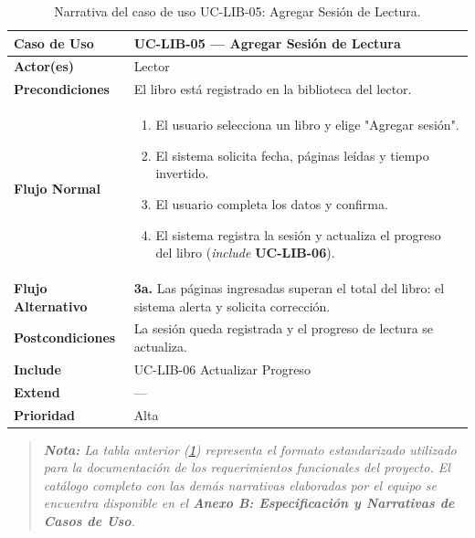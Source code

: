 \documentclass[12pt, atypical, journal]{article}
\begin{document}
\begin{table}[H]
\centering
\footnotesize
\begin{tabular}{|p{3.5cm}|p{10.5cm}|}
\hline
\textbf{Caso de Uso} & \textbf{UC-LIB-05 — Agregar Sesión de Lectura} \\ \hline
\textbf{Actor(es)} & Lector \\ \hline
\textbf{Precondiciones} & El libro está registrado en la biblioteca del lector. \\ \hline
\textbf{Flujo Normal} & 
\begin{minipage}{10cm}
\vspace{1mm}
\begin{enumerate}
    \item El usuario selecciona un libro y elige "Agregar sesión".
    \item El sistema solicita fecha, páginas leídas y tiempo invertido.
    \item El usuario completa los datos y confirma.
    \item El sistema registra la sesión y actualiza el progreso del libro (\textit{include} \textbf{UC-LIB-06}).
\end{enumerate}
\vspace{1mm}
\end{minipage} \\ \hline
\textbf{Flujo Alternativo} & 
\begin{minipage}{10cm}
\vspace{1mm}
\textbf{3a.} Las páginas ingresadas superan el total del libro: el sistema alerta y solicita corrección.
\vspace{1mm}
\end{minipage} \\ \hline
\textbf{Postcondiciones} & La sesión queda registrada y el progreso de lectura se actualiza. \\ \hline
\textbf{Include} & UC-LIB-06 Actualizar Progreso \\ \hline
\textbf{Extend} & — \\ \hline
\textbf{Prioridad} & Alta \\ \hline
\end{tabular}
\caption{Narrativa del caso de uso UC-LIB-05: Agregar Sesión de Lectura.}
\label{tab:uc_lib_05}
\end{table}

\begin{quote}
\textit{\textbf{Nota:} La tabla anterior (\ref{tab:uc_lib_05}) representa el formato estandarizado utilizado para la documentación de los requerimientos funcionales del proyecto. El catálogo completo con las demás narrativas elaboradas por el equipo se encuentra disponible en el \textbf{Anexo B: Especificación y Narrativas de Casos de Uso}.}
\end{quote}
\end{document}
